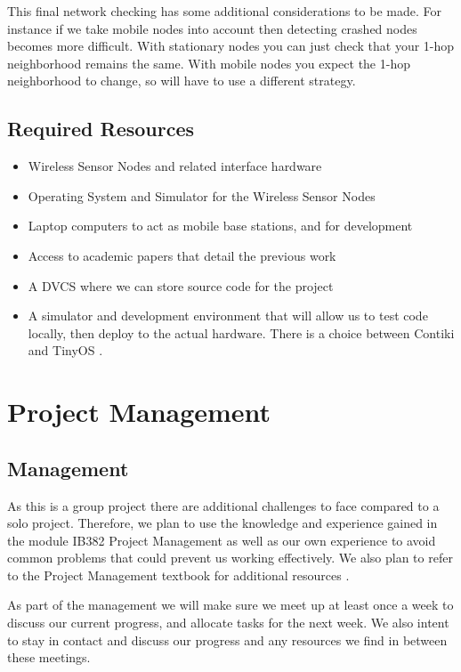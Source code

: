 \documentclass[a4paper]{article}
\begin{document}
This final network checking has some additional considerations to be made. For instance if we take mobile nodes into account then detecting crashed nodes becomes more difficult. With stationary nodes you can just check that your 1-hop neighborhood remains the same. With mobile nodes you expect the 1-hop neighborhood to change, so will have to use a different strategy.


\subsection{Required Resources}
\begin{itemize}
	\item Wireless Sensor Nodes and related interface hardware
	\item Operating System and Simulator for the Wireless Sensor Nodes
	\item Laptop computers to act as mobile base stations, and for development
	\item Access to academic papers that detail the previous work
	\item A DVCS where we can store source code for the project
	\item A simulator and development environment that will allow us to test code locally, then deploy to the actual hardware. There is a choice between Contiki \cite{23839452} and TinyOS \cite{levis2003tossim}.
\end{itemize}

\section{Project Management}

\subsection{Management}

As this is a group project there are additional challenges to face compared to a solo project. Therefore, we plan to use the knowledge and experience gained in the module IB382 Project Management \cite{IB382} as well as our own experience to avoid common problems that could prevent us working effectively. We also plan to refer to the Project Management textbook for additional resources \cite{PMTextBook}.

As part of the management we will make sure we meet up at least once a week to discuss our current progress, and allocate tasks for the next week. We also intent to stay in contact and discuss our progress and any resources we find in between these meetings.
\end{document}
